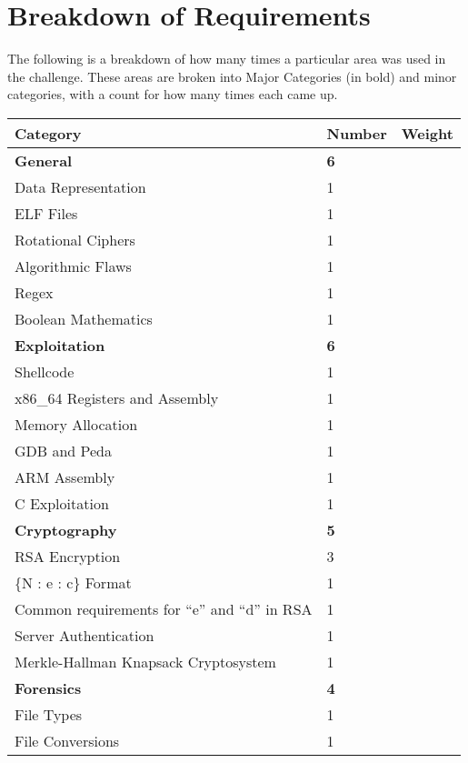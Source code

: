 \documentclass[a4paper,11pt]{report}
\begin{document}
	\section{Breakdown of Requirements}
	 	The following is a breakdown of how many times a particular area was used in the challenge. 
		These areas are broken into Major Categories (in bold) and minor categories, with a count for how many times each came up. 
		\begin{table}[htb]
			\centering
			\begin{tabular}{| l | l | l |}
				\hline
				\textbf{Category} & \textbf{Number} & \textbf{Weight} \\ \hline 
				\textbf{General} & \textbf{6} & \\ \hline
				\quad Data Representation & 1 & \\ \hline
				\quad ELF Files & 1 & \\ \hline
				\quad Rotational Ciphers & 1 & \\ \hline
				\quad Algorithmic Flaws & 1 & \\ \hline 
				\quad Regex & 1 & \\ \hline 
				\quad Boolean Mathematics & 1 & \\ \hline 
				\textbf{Exploitation} & \textbf{6} & \\ \hline
				\quad Shellcode & 1 & \\ \hline
				\quad x86\_64 Registers and Assembly & 1 & \\ \hline
				\quad Memory Allocation & 1 & \\ \hline
				\quad GDB and Peda & 1 & \\ \hline
				\quad ARM Assembly & 1 & \\ \hline
				\quad C Exploitation & 1 & \\ \hline 
				\textbf{Cryptography} & \textbf{5} & \\ \hline
				\quad RSA Encryption & 3 & \\ \hline
				\qquad \{N : e : c\} Format & 1 & \\ \hline
				\qquad Common requirements for ``e'' and ``d'' in RSA & 1 & \\ \hline
				\quad Server Authentication & 1 & \\ \hline
				\quad Merkle-Hallman Knapsack Cryptosystem & 1 & \\ \hline
				\textbf{Forensics} & \textbf{4} & \\ \hline
				\quad File Types & 1 & \\ \hline
				\quad File Conversions & 1 & \\ \hline 

\end{tabular}
\end{table}
\end{document}
